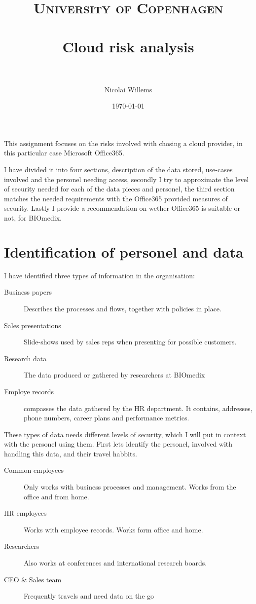 \documentclass[paper=a4, fontsize=11pt]{scrartcl} %
\title{	
\normalfont \normalsize 
\textsc{University of Copenhagen} \\ [25pt] %
\horrule{0.5pt} \\[0.4cm] %
\huge Cloud risk analysis\\ %
\horrule{2pt} \\[0.5cm] %
}
\author{Nicolai Willems} %
\date{\normalsize\today} %
\numberwithin{equation}{section} %
\numberwithin{figure}{section} %
\numberwithin{table}{section} %
\begin{document}
\maketitle %


This assignment focuses on the risks involved with chosing a cloud provider, in
this particular case Microsoft Office365.

I have divided it into four sections, description of the data stored,
use-cases involved and the personel needing access, secondly I try to 
approximate the level of security needed for each of the data pieces and 
personel, the third section matches the needed requirements with the Office365
provided measures of security. Lastly I provide a recommendation on wether
Office365 is suitable or not, for BIOmedix.

\section{Identification of personel and data}
I have identified three types of information in the organisation:

\begin{description}
\item[Business papers] Describes the processes and flows, together with
    policies in place.
\item[Sales presentations] Slide-shows used by sales reps when presenting for
    possible customers.
\item[Research data] The data produced or gathered by researchers at BIOmedix
\item[Employe records] compasses the data gathered by the HR department. It
    contains, addresses, phone numbers, career plans and performance metrics.
\end{description}

These types of data needs different levels of security, which I will put in
context with the personel using them. First lets identify the personel,
involved with handling this data, and their travel habbits.

\begin{description}
\item[Common employees] Only works with business processes and management. Works
    from the office and from home.
\item[HR employees] Works with employee records. Works form office and home.
\item[Researchers] Also works at conferences and international research boards.
\item[CEO \& Sales team] Frequently travels and need data on the go
\end{description}
\end{document}
